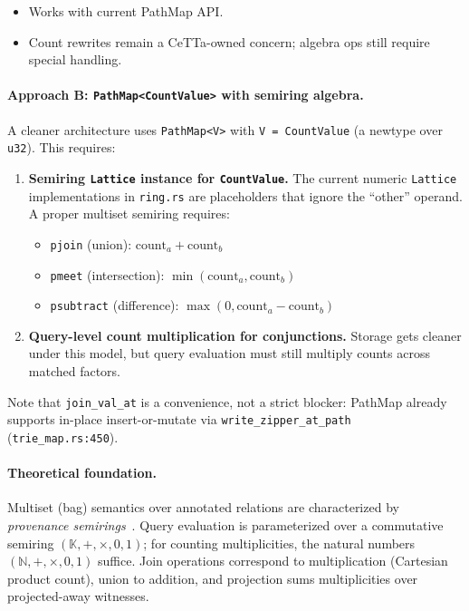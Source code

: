 \documentclass[11pt]{article}
\theoremstyle{definition}
\theoremstyle{remark}
\newcommand{\PathMap}{\textup{PathMap}}
\begin{document}
\begin{itemize}[nosep]
  \item Works with current \PathMap{} API.
  \item Count rewrites remain a CeTTa-owned concern; algebra ops still require
    special handling.
\end{itemize}

\paragraph{Approach B: \texttt{PathMap<CountValue>} with semiring algebra.}
A cleaner architecture uses \texttt{PathMap<V>} with \texttt{V = CountValue}
(a newtype over \texttt{u32}).  This requires:

\begin{enumerate}[nosep]
  \item \textbf{Semiring \texttt{Lattice} instance for \texttt{CountValue}.}
    The current numeric \texttt{Lattice} implementations in
    \texttt{ring.rs} are placeholders that ignore the ``other'' operand.
    A proper multiset semiring requires:
    \begin{itemize}[nosep]
      \item \texttt{pjoin} (union): $\text{count}_a + \text{count}_b$
      \item \texttt{pmeet} (intersection): $\min(\text{count}_a, \text{count}_b)$
      \item \texttt{psubtract} (difference): $\max(0, \text{count}_a - \text{count}_b)$
    \end{itemize}

  \item \textbf{Query-level count multiplication for conjunctions.}
    Storage gets cleaner under this model, but query evaluation must
    still multiply counts across matched factors.
\end{enumerate}
Note that \texttt{join\_val\_at} is a convenience, not a strict blocker:
\PathMap{} already supports in-place insert-or-mutate via
\texttt{write\_zipper\_at\_path} (\texttt{trie\_map.rs:450}).

\paragraph{Theoretical foundation.}
Multiset (bag) semantics over annotated relations are characterized by
\emph{provenance semirings}~\cite{GreenProvenanceSemirings2007}.
Query evaluation is parameterized over a commutative semiring
$(\mathbb{K}, +, \times, 0, 1)$; for counting multiplicities, the
natural numbers $(\mathbb{N}, +, \times, 0, 1)$ suffice.  Join operations
correspond to multiplication (Cartesian product count), union to addition,
and projection sums multiplicities over projected-away witnesses.
\end{document}
